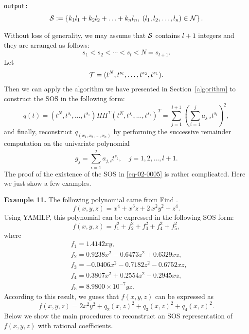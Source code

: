 \documentclass[runningheads]{llncs}
\begin{document}
{{\tt output: }
$$
{\cal S}:=\left\{ {k_1l_1+k_2l_2+\ldots+k_nl_n},\; (l_1,l_2,\ldots,l_n)\in {\cal N} \right\}.
$$

Without loss of generality, we may assume that ${\cal S}$ contains $l+1$ integers and they are arranged as follows:
$$
s_1<s_2<\cdots<s_l<N=s_{l+1}. 
$$
Let 
$$
{\cal T}=(t^N,t^{s_l},\ldots,t^{s_2},t^{s_1}).
$$
Then we can apply the algorithm we have presented in Section~\ref{algorithm} to construct the SOS in the following form:
\begin{equation}\label{eq-02-0005}
q(t)=
(t^N,t^{s_l},\ldots,t^{s_1})HH^T(t^N,t^{s_l},\ldots,t^{s_1})
^T
=\sum_{j=1}^{l+1}\left(\sum_{i=1}^{j}a_{j,i}t^{s_i}\right)^2,
\end{equation}
and finally, reconstruct $q_(x_1,x_2,\ldots,x_n)$ by performing the 
successive remainder computation on the univariate polynomial  
$$
g_j=\sum_{i=1}^{j}a_{j,i}t^{s_j}, \quad j=1,2,\ldots,l+1. 
$$
The proof of the existence of the SOS in \eqref{eq-02-0005} is rather complicated. Here we just show a few examples.
\medskip 

{\bf Example 11. } The following polynomial came from Find \cite{Powers1998}. 
$$
f(x,y,z)={x}^{4}+{x}^{3}z+2\,{x}^{2}{y}^{2}+{z}^{4}.
$$
Using YAMILP, this polynomial can be expressed
in the following SOS form:
$$
f(x,y,z)
=f_1^2+f_2^2+f_3^2+f_4^2+f_5^2,
$$
where
\begin{align*}
&f_1 = 1.4142  x  y,\\
&f_2 = 0.9238  x^2 - 0.6473  z^2 + 0.6329  x  z,\\
&f_3 = -0.0406  x^2 - 0.7182  z^2 - 0.6752  x  z,\\
&f_4 = 0.3807  x^2 + 0.2554  z^2 - 0.2945  x  z,\\
&f_5 = 8.9800\times 10^{ - 7}  y  z.
\end{align*}
According to this result, we guess that
$f(x,y,z)$ can be expressed as
$$
f(x,y,z)=2x^2y^2+q_2(x,z)^2+q_3(x,z)^2+q_4(x,z)^2.
$$
Below we show the main procedures to reconstruct 
an SOS representation of $f(x,y,z)$ with rational coefficients.

}
\end{document}
